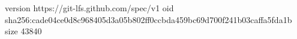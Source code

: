 version https://git-lfs.github.com/spec/v1
oid sha256:cade04ce0d8c968405d3a05b802ff0ccbda459bc69d700f241b03caffa5fda1b
size 43840
